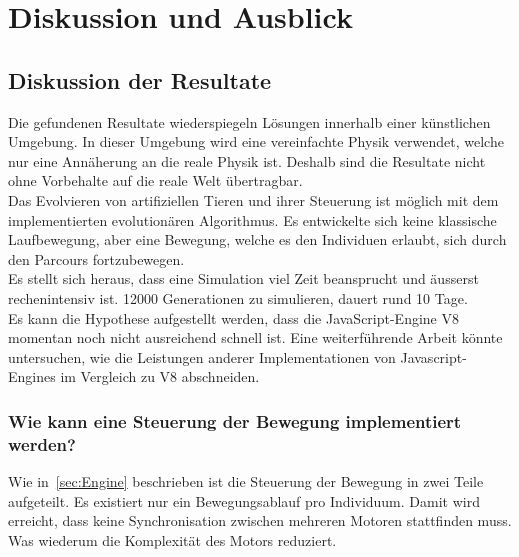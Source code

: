 %
%


\chapter{Diskussion und Ausblick\label{chap:perspective}}


  \section{Diskussion der Resultate\label{sec:diskRes}}

    Die gefundenen Resultate wiederspiegeln Lösungen innerhalb einer künstlichen Umgebung.
    In dieser Umgebung wird eine vereinfachte Physik verwendet, welche nur eine Annäherung an die reale Physik ist.
    Deshalb sind die Resultate nicht ohne Vorbehalte auf die reale Welt übertragbar.
    \\
    Das Evolvieren von artifiziellen Tieren und ihrer Steuerung ist möglich
    mit dem implementierten evolutionären Algorithmus.
    Es entwickelte sich keine klassische Laufbewegung,
    aber eine Bewegung, welche es den Individuen erlaubt, sich durch den Parcours fortzubewegen.
    \\
    Es stellt sich heraus, dass eine Simulation viel Zeit beansprucht und äusserst rechenintensiv ist.
    12000 Generationen zu simulieren, dauert rund 10 Tage.
    \\
    Es kann die Hypothese aufgestellt werden, dass die JavaScript-Engine V8 momentan noch nicht ausreichend schnell ist.
    Eine weiterführende Arbeit könnte untersuchen,
    wie die Leistungen anderer Implementationen von Javascript-Engines im Vergleich zu V8 abschneiden. %

    \subsection{Wie kann eine Steuerung der Bewegung implementiert werden?}

      Wie in~\vref{sec:Engine} beschrieben ist die Steuerung der Bewegung in zwei Teile aufgeteilt.
      Es existiert nur ein Bewegungsablauf pro Individuum.
      Damit wird erreicht, dass keine Synchronisation zwischen mehreren Motoren stattfinden muss.
      Was wiederum die Komplexität des Motors reduziert.

